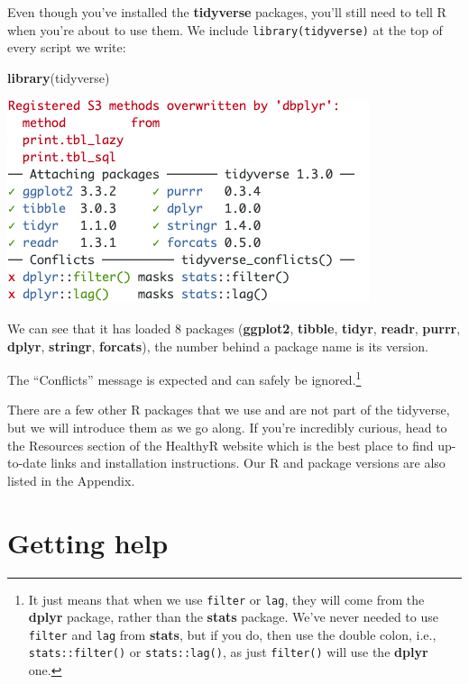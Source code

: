 \documentclass[
  12pt,
  krantz2]{krantz}
\makeatletter
\newenvironment{Shaded}{\begin{snugshade}}{\end{snugshade}}
\newcommand{\KeywordTok}[1]{\textcolor[rgb]{0.13,0.29,0.53}{\textbf{#1}}}
\newcommand{\NormalTok}[1]{#1}
\newenvironment{kframe}{%
\medskip{}
\setlength{\fboxsep}{.8em}
 \def\at@end@of@kframe{}%
 \ifinner\ifhmode%
  \def\at@end@of@kframe{\end{minipage}}%
  \begin{minipage}{\columnwidth}%
 \fi\fi%
 \def\FrameCommand##1{\hskip\@totalleftmargin \hskip-\fboxsep
 \colorbox{shadecolor}{##1}\hskip-\fboxsep
     \hskip-\linewidth \hskip-\@totalleftmargin \hskip\columnwidth}%
 \MakeFramed {\advance\hsize-\width
   \@totalleftmargin\z@ \linewidth\hsize
   \@setminipage}}%
 {\par\unskip\endMakeFramed%
 \at@end@of@kframe}
\renewenvironment{Shaded}{\begin{kframe}}{\end{kframe}}
\makeatother
\begin{document}
Even though you've installed the \textbf{tidyverse} packages, you'll still need to tell R when you're about to use them.
We include \texttt{library(tidyverse)} at the top of every script we write:

\begin{Shaded}
\begin{Highlighting}[]
\KeywordTok{library}\NormalTok{(tidyverse)}
\end{Highlighting}
\end{Shaded}

\includegraphics[width=0.7\linewidth]{images/chapter01/tidyverse_loading_messages}

We can see that it has loaded 8 packages (\textbf{ggplot2}, \textbf{tibble}, \textbf{tidyr}, \textbf{readr}, \textbf{purrr}, \textbf{dplyr}, \textbf{stringr}, \textbf{forcats}), the number behind a package name is its version.

The ``Conflicts'' message is expected and can safely be ignored.\footnote{It just means that when we use \texttt{filter} or \texttt{lag}, they will come from the \textbf{dplyr} package, rather than the \textbf{stats} package.
  We've never needed to use \texttt{filter} and \texttt{lag} from \textbf{stats}, but if you do, then use the double colon, i.e., \texttt{stats::filter()} or \texttt{stats::lag()}, as just \texttt{filter()} will use the \textbf{dplyr} one.}

There are a few other R packages that we use and are not part of the tidyverse, but we will introduce them as we go along.
If you're incredibly curious, head to the Resources section of the HealthyR website which is the best place to find up-to-date links and installation instructions. Our R and package versions are also listed in the Appendix.

\hypertarget{getting-help}{%
\section{Getting help}\label{getting-help}}
\end{document}
